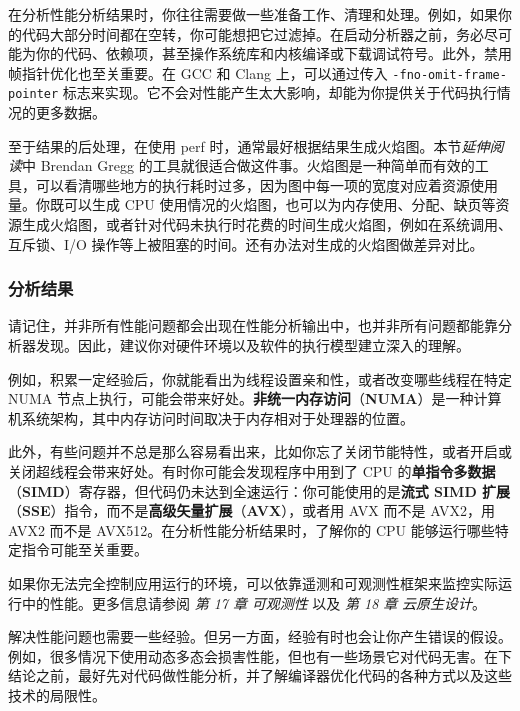 \label{idx:1202}
\label{idx:1203}
在分析性能分析结果时，你往往需要做一些准备工作、清理和处理。例如，如果你的代码大部分时间都在空转，你可能想把它过滤掉。在启动分析器之前，务必尽可能为你的代码、依赖项，甚至操作系统库和内核编译或下载调试符号。此外，禁用帧指针优化也至关重要。在 GCC 和 Clang 上，可以通过传入 \texttt{-fno-omit-frame-pointer} 标志来实现。它不会对性能产生太大影响，却能为你提供关于代码执行情况的更多数据。

至于结果的后处理，在使用 perf 时，通常最好根据结果生成火焰图。本节\emph{延伸阅读}中 Brendan Gregg 的工具就很适合做这件事。火焰图是一种简单而有效的工具，可以看清哪些地方的执行耗时过多，因为图中每一项的宽度对应着资源使用量。你既可以生成 CPU 使用情况的火焰图，也可以为内存使用、分配、缺页等资源生成火焰图，或者针对代码未执行时花费的时间生成火焰图，例如在系统调用、互斥锁、I/O 操作等上被阻塞的时间。还有办法对生成的火焰图做差异对比。

\subsubsection{分析结果}

\label{idx:1204}
请记住，并非所有性能问题都会出现在性能分析输出中，也并非所有问题都能靠分析器发现。因此，建议你对硬件环境以及软件的执行模型建立深入的理解。

\label{idx:1205}
例如，积累一定经验后，你就能看出为线程设置亲和性，或者改变哪些线程在特定 NUMA 节点上执行，可能会带来好处。\textbf{非统一内存访问}（\textbf{NUMA}）是一种计算机系统架构，其中内存访问时间取决于内存相对于处理器的位置。

\label{idx:1206}
\label{idx:1207}
\label{idx:1208}
此外，有些问题并不总是那么容易看出来，比如你忘了关闭节能特性，或者开启或关闭超线程会带来好处。有时你可能会发现程序中用到了 CPU 的\textbf{单指令多数据}（\textbf{SIMD}）寄存器，但代码仍未达到全速运行：你可能使用的是\textbf{流式 SIMD 扩展}（\textbf{SSE}）指令，而不是\textbf{高级矢量扩展}（\textbf{AVX}），或者用 AVX 而不是 AVX2，用 AVX2 而不是 AVX512。在分析性能分析结果时，了解你的 CPU 能够运行哪些特定指令可能至关重要。

如果你无法完全控制应用运行的环境，可以依靠遥测和可观测性框架来监控实际运行中的性能。更多信息请参阅 \emph{第 17 章} \emph{可观测性} 以及 \emph{第 18 章} \emph{云原生设计}。

解决性能问题也需要一些经验。但另一方面，经验有时也会让你产生错误的假设。例如，很多情况下使用动态多态会损害性能，但也有一些场景它对代码无害。在下结论之前，最好先对代码做性能分析，并了解编译器优化代码的各种方式以及这些技术的局限性。

